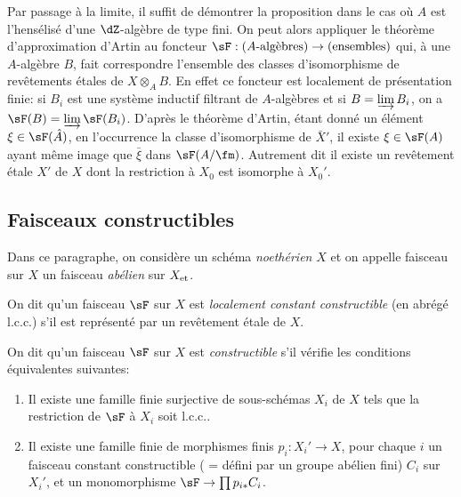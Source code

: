 Par passage à la limite, il suffit de démontrer la proposition dans le cas 
où $A$ est l'hensélisé d'une $\dZ$-algèbre de type fini. On peut alors 
appliquer le théorème d'approximation d'Artin au foncteur 
$\sF:(\textnormal{$A$-algèbres}) \to (\textnormal{ensembles})$ qui, à une 
$A$-algèbre $B$, fait correspondre l'ensemble des classes d'isomorphisme de 
revêtements étales de $X\otimes_A B$. En effet ce foncteur est localement de 
présentation finie: si $B_i$ est une système inductif filtrant de 
$A$-algèbres et si $B=\varinjlim B_i$, on a $\sF(B) = \varinjlim \sF(B_i)$. 
D'après le théorème d'Artin, étant donné un élément 
$\xi\in \sF(\hat A)$, en l'occurrence la classe d'isomorphisme de $\bar X'$, il 
existe $\xi\in \sF(A)$ ayant même image que $\bar\xi$ dans $\sF(A/\fm)$. 
Autrement dit il existe un revêtement étale $X'$ de $X$ dont la restriction 
à $X_0$ est isomorphe à $X_0'$. 










\subsection{Faisceaux constructibles}\label{I:4-3}

Dans ce paragraphe, on considère un schéma \emph{noethérien} $X$ et on 
appelle faisceau sur $X$ un faisceau \emph{abélien} sur ${X}_{\textnormal{et}}$. 





\begin{definition}\label{I:4-3-1}
On dit qu'un faisceau $\sF$ sur $X$ est \emph{localement constant constructible} 
(en abrégé l.c.c.) s'il est représenté par un revêtement étale de 
$X$. 
\end{definition}





\begin{definition}\label{I:4-3-2}
On dit qu'un faisceau $\sF$ sur $X$ est \emph{constructible} s'il vérifie les 
conditions équivalentes suivantes:
\begin{enumerate}[\indent (i)]
  \item Il existe une famille finie surjective de sous-schémas $X_i$ de $X$ 
     tels que la restriction de $\sF$ à $X_i$ soit l.c.c..
  \item Il existe une famille finie de morphismes finis $p_i:X_i'\to X$, pour 
    chaque $i$ un faisceau constant constructible ( = défini par un groupe 
    abélien fini) $C_i$ sur $X_i'$, et un monomorphisme 
    $\sF\to \prod p_{i*} C_i$. 
\end{enumerate}
\end{definition}

